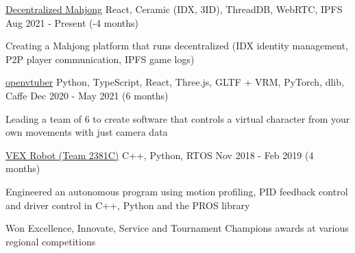 \begin{cventries}
	\cventry
	{\href{https://github.com/fensandemajiang/fensandemajiang}{Decentralized Mahjong}}
	{React, Ceramic (IDX, 3ID), ThreadDB, WebRTC, IPFS}
	{}
	{Aug 2021 - Present  (-4 months)}
	{
		\begin{cvitems}
			\item{Creating a Mahjong platform that runs decentralized (IDX identity management, P2P player communication, IPFS game logs)}
		\end{cvitems}
	}
	\cventry
	{\href{https://github.com/virtuber/openvtuber}{openvtuber}}
	{Python, TypeScript, React, Three.js, GLTF + VRM, PyTorch, dlib, Caffe}
	{}
	{Dec 2020 - May 2021 (6 months)}
	{
		\begin{cvitems}
			\item{Leading a team of 6 to create software that controls a virtual character from your own movements with just camera data}
		\end{cvitems}
	}
	\cventry
	{\href{https://gitlab.com/2381-robotics/2381C-V2}{VEX Robot (Team 2381C)}}
	{C++, Python, RTOS}
	{}
	{Nov 2018 - Feb 2019 (4 months)}
	{
		\begin{cvitems}
			\item{Engineered an autonomous program using motion profiling, PID feedback control and driver control in C++, Python and the PROS library}
			\item{Won Excellence, Innovate, Service and Tournament Champions awards at various regional competitions}
		\end{cvitems}
	}
\end{cventries}
